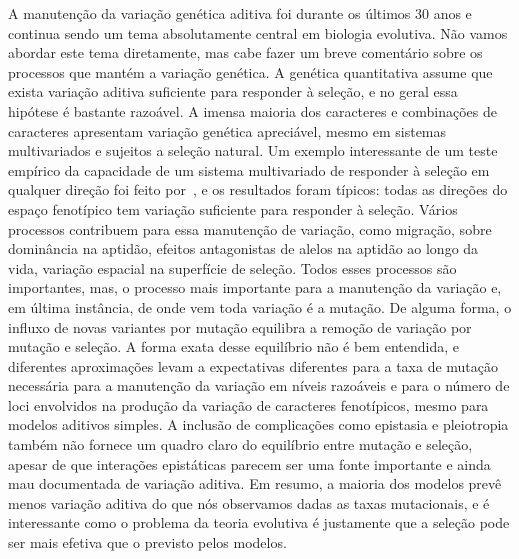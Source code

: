 \begin{refsection}
A manutenção da variação genética aditiva foi durante os últimos 30 anos e
continua sendo um tema absolutamente central em biologia evolutiva. Não vamos
abordar este tema diretamente, mas cabe fazer um breve comentário sobre os
processos que mantém a variação genética. A genética quantitativa assume que
exista variação aditiva suficiente para responder à seleção, e no geral essa
hipótese é bastante razoável. A imensa maioria dos caracteres e combinações de
caracteres apresentam variação genética apreciável, mesmo em sistemas
multivariados e sujeitos a seleção natural. Um exemplo interessante de um
teste empírico da capacidade de um sistema multivariado de responder à seleção
em qualquer direção foi feito por~\textcite{Hine2014-ps}, e os resultados
foram típicos: todas as direções do espaço fenotípico tem variação suficiente
para responder à seleção. Vários processos contribuem para essa manutenção de
variação, como migração, sobre dominância na aptidão, efeitos antagonistas de
alelos na aptidão ao longo da vida, variação espacial na superfície de
seleção. Todos esses processos são importantes, mas, o processo mais
importante para a manutenção da variação e, em última instância, de onde vem
toda variação é a mutação. De alguma forma, o influxo de novas variantes por
mutação equilibra a remoção de variação por mutação e seleção. A forma exata
desse equilíbrio não é bem entendida, e diferentes aproximações levam a
expectativas diferentes para a taxa de mutação necessária para a manutenção da
variação em níveis razoáveis e para o número de loci envolvidos na produção da
variação de caracteres fenotípicos, mesmo para modelos aditivos simples. A
inclusão de complicações como epistasia e pleiotropia também não fornece um
quadro claro do equilíbrio entre mutação e seleção, apesar de que interações
epistáticas parecem ser uma fonte importante e ainda mau documentada de
variação aditiva. Em resumo, a maioria dos modelos prevê menos variação
aditiva do que nós observamos dadas as taxas mutacionais, e é interessante
como o problema da teoria evolutiva é justamente que a seleção pode ser mais
efetiva que o previsto pelos modelos.


\end{refsection}
